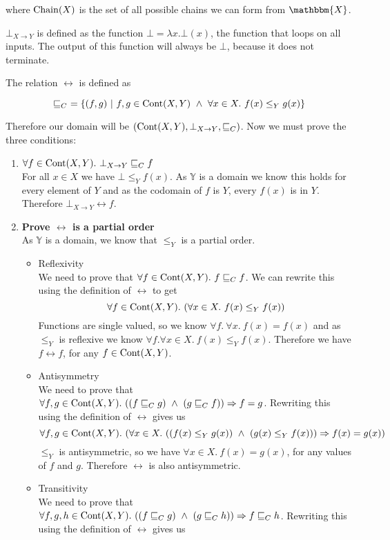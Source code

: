 where $\operatorname{Chain}(X)$ is the set of all possible chains we can form from  $\mathbbm{X}$.

$\bot_{X \to Y}$ is defined as the function $\bot = \lambda x. \bot (x)$, the function that loops on all inputs. The output of this function will always be $\bot$, because it does not terminate. 

The relation $\rel$ is defined as

\[ \sqsubseteq_{C}  \ = \{ (f , g) \ | \ f,g \in \operatorname{Cont}(X,Y) \ \wedge \ \forall x \in X. \ f(x) \leq_Y g(x)\} \]

Therefore our domain will be $(\operatorname{Cont}(X,Y), \bot_{X \to Y}, \sqsubseteq_C)$. Now we must prove the three conditions:

\vspace{0.25cm}

\begin{enumerate}
\item{$\forall f \in \cont(X,Y). \ \bot_{X \to Y} \rel f$ \\
For all $x \in X$ we have $\bot \leq_Y f(x)$. As $\mathbb{Y}$ is a domain we know this holds for every element of $Y$ and as the codomain of $f$ is $Y$, every $f(x)$ is in $Y$. Therefore $\bot_{X \to Y} \rel f$.}
\item{\textbf{Prove $\rel$ is a partial order}\\
As $\mathbb{Y}$ is a domain, we know that $\leq_Y$ is a partial order.
\begin{itemize}
\item{Reflexivity\\
We need to prove that $\forall f \in \operatorname{Cont}(X,Y). \ f \sqsubseteq_{C} f$. We can rewrite this using the definition of $\rel$ to get 
\[\forall f \in \operatorname{Cont}(X,Y). \ (\forall x \in X. \ f(x) \leq_Y f(x))\]
 Functions are single valued, so we know $\forall f. \ \forall x. \ f(x) = f(x)$ and as $\leq_Y$ is reflexive we know $\forall f. \forall x \in X. \ f(x) \leq_Y f(x)$. Therefore we have $f \rel f$, for any $f \in \operatorname{Cont}(X,Y)$. }
\item{Antisymmetry\\
We need to prove that $\forall f,g \in \operatorname{Cont}(X,Y). \ ((f \sqsubseteq_{C} g) \ \wedge \ (g \sqsubseteq_{C} f)) \Rightarrow f = g$. Rewriting this using the definition of $\rel$ gives us
 \[\forall f,g \in \cont(X,Y). \ (\forall x \in X. \ ((f(x) \leq_Y g(x)) \ \wedge \ (g(x) \leq_Y f(x))) \Rightarrow f(x) = g(x))\] 
 $\leq_Y$ is antisymmetric, so we have $\forall x \in X. \ f(x) = g(x)$, for any values of $f$ and $g$. Therefore $\rel$ is also antisymmetric. }
\item{Transitivity\\
We need to prove that $\forall f,g,h \in \operatorname{Cont}(X,Y). \ ((f \sqsubseteq_{C} g) \  \wedge \ (g \sqsubseteq_{C} h)) \Rightarrow f \sqsubseteq_{C} h$. Rewriting this using the definition of $\rel$ gives us 

}
\end{itemize}}
\end{enumerate}
